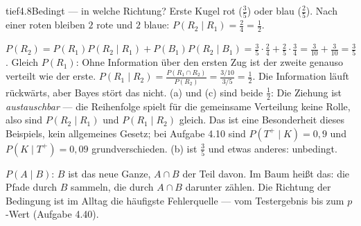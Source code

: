 \begin{loesungkarte}{tief}{4.8}{Bedingt --- in welche Richtung?}
Erste Kugel rot ($\frac35$) oder blau ($\frac25$). Nach einer roten bleiben $2$ rote und $2$ blaue: $P(R_2\mid R_1) = \frac24 = \frac12$.
\begin{center}
\end{center}
$P(R_2) = P(R_1)P(R_2\mid R_1) + P(B_1)P(R_2\mid B_1) = \frac35\cdot\frac24 + \frac25\cdot\frac34 = \frac3{10} + \frac3{10} = \frac35$. Gleich $P(R_1)$: Ohne Information über den ersten Zug ist der zweite genauso verteilt wie der erste.
$P(R_1\mid R_2) = \frac{P(R_1\cap R_2)}{P(R_2)} = \frac{3/10}{3/5} = \frac12$. Die Information läuft rückwärts, aber Bayes stört das nicht.
(a) und (c) sind beide $\frac12$: Die Ziehung ist \emph{austauschbar} --- die Reihenfolge spielt für die gemeinsame Verteilung keine Rolle, also sind $P(R_2\mid R_1)$ und $P(R_1\mid R_2)$ gleich. Das ist eine Besonderheit dieses Beispiels, kein allgemeines Gesetz; bei Aufgabe 4.10 sind $P(T^{+}\mid K) = 0{,}9$ und $P(K\mid T^{+}) = 0{,}09$ grundverschieden. (b) ist $\frac35$ und etwas anderes: unbedingt.
\begin{mitnehmen}\kastentext
$P(A\mid B)$: $B$ ist das neue Ganze, $A\cap B$ der Teil davon. Im Baum heißt das: die Pfade durch $B$ sammeln, die durch $A\cap B$ darunter zählen. Die Richtung der Bedingung ist im Alltag die häufigste Fehlerquelle --- vom Testergebnis bis zum $p$-Wert (Aufgabe 4.40).
\end{mitnehmen}
\end{loesungkarte}


